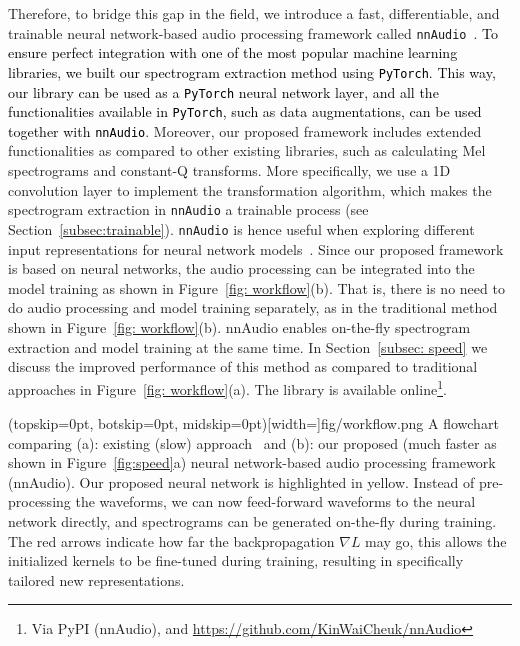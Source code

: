 \documentclass{ieeeaccess}
\newcommand{\nbh}[1]{\texttt{#1}}
\newcommand{\newtext}[1]{\textcolor{black}{#1}} %
\begin{document}
 {Therefore, to bridge this gap in the field, we introduce a fast, differentiable, and trainable neural network-based audio processing framework called \nbh{nnAudio}~\cite{nnAudio}. \newtext{To ensure perfect integration with one of the most popular machine learning libraries, we built our spectrogram extraction method using \nbh{PyTorch}. This way, our library can be used as a \nbh{PyTorch} neural network layer, and all the functionalities available in \nbh{PyTorch}, such as data augmentations, can be used together with \nbh{nnAudio}}. Moreover, our proposed framework includes extended functionalities as compared to other existing libraries, such as calculating Mel spectrograms and constant-Q transforms. More specifically, we use a 1D convolution layer to implement the transformation algorithm, which makes the spectrogram extraction in \nbh{nnAudio} a trainable process (see Section~\ref{subsec:trainable}). \nbh{nnAudio} is hence useful when exploring different input representations for neural network models~\cite{balamurali2019toward,kelz2016potential}. Since our proposed framework is based on neural networks, the audio processing can be integrated into the model training as shown in Figure~\ref{fig: workflow}(b). That is, there is no need to do audio processing and model training separately, as in the traditional method shown in Figure~\ref{fig: workflow}(b). nnAudio enables on-the-fly spectrogram extraction and model training at the same time. In Section~\ref{subsec: speed} we discuss the improved performance of this method as compared to traditional approaches in Figure~\ref{fig: workflow}(a). The library is available online\footnote{\label{nnAudio} Via PyPI (nnAudio), and \url{https://github.com/KinWaiCheuk/nnAudio}}.}

 

\Figure(topskip=0pt, botskip=0pt, midskip=0pt)[width=\linewidth]{fig/workflow.png}
{A flowchart comparing (a): existing (slow) approach~\cite{wang2017two, yenigalla2018speech, wyse2017audio, lederle2018combining, sakashita2018acoustic, weiping2017acoustic, zhang2017empirical, murauer2018detecting, dong2018convolutional} and (b): our proposed (much faster as shown in Figure~\ref{fig:speed}a) neural network-based audio processing framework (nnAudio). Our proposed neural network is highlighted in yellow. Instead of pre-processing the waveforms, we can now feed-forward waveforms to the neural network directly, and spectrograms can be generated on-the-fly during training. The red arrows indicate how far the backpropagation $\nabla L$ may go, this allows the initialized kernels to be fine-tuned during training, resulting in specifically tailored new representations.} \label{fig: workflow}
\end{document}
